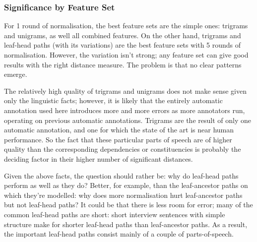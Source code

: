 \subsubsection{Significance by Feature Set}



For 1 round of normalisation, the best feature sets are the simple
ones: trigrams and unigrams, as well all combined features. On the
other hand, trigrams and leaf-head paths (with its variations) are the
best feature sets with 5 rounds of normalisation. However, the
variation isn't strong; any feature set can give good results with the
right distance measure. The problem is that no clear patterns emerge.

The relatively high quality of trigrams and unigrams does not make
sense given only the linguistic facts; however, it is likely that the
entirely automatic annotation used here introduces more and more
errors as more annotators run, operating on previous automatic
annotations. Trigrams are the result of only one automatic annotation,
and one for which the state of the art is near human performance. So
the fact that these particular parts of speech are of higher quality
than the corresponding dependencies or constituencies is probably the
deciding factor in their higher number of significant
distances.


Given the above facts, the question should rather be: why do leaf-head
paths perform as well as they do? Better, for example, than the
leaf-ancestor paths on which they're modelled: why does more
normalisation hurt leaf-ancestor paths but not leaf-head paths?  It
could be that there is less room for error; many of the common
leaf-head paths are short: short interview sentences with simple
structure make for shorter leaf-head paths than leaf-ancestor
paths. As a result, the important leaf-head paths consist mainly of a
couple of parts-of-speech.

